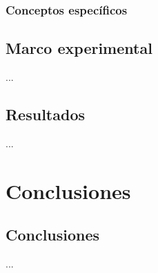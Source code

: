 \documentclass[spanish,11pt,letterpaper,oneside]{memoir}
\begin{document}
\section{Conceptos específicos}

\chapter{Marco experimental}

...

\chapter{Resultados}

...

\part{Conclusiones}
\chapter{Conclusiones}

...

\printbibliography
\end{document}
